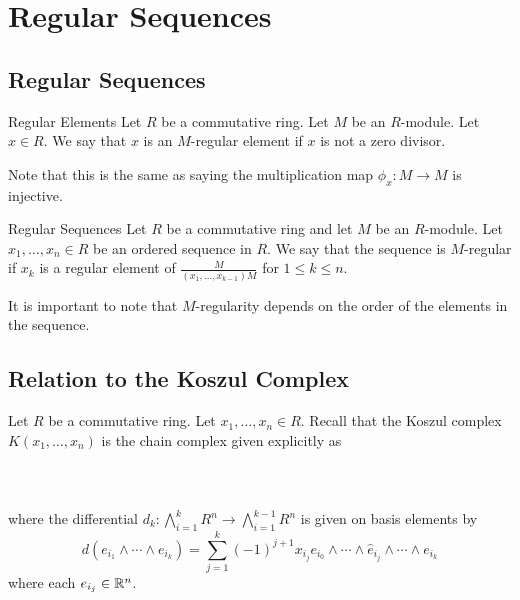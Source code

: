 \documentclass[a4paper]{article}
\begin{document}
\pagebreak
\section{Regular Sequences}
\subsection{Regular Sequences}
\begin{defn}{Regular Elements}{} Let $R$ be a commutative ring. Let $M$ be an $R$-module. Let $x\in R$. We say that $x$ is an $M$-regular element if $x$ is not a zero divisor. 
\end{defn}

Note that this is the same as saying the multiplication map $\phi_x:M\to M$ is injective. 

\begin{defn}{Regular Sequences}{} Let $R$ be a commutative ring and let $M$ be an $R$-module. Let $x_1,\dots,x_n\in R$ be an ordered sequence in $R$. We say that the sequence is $M$-regular if $x_k$ is a regular element of $\frac{M}{(x_1,\dots,x_{k-1})M}$ for $1\leq k\leq n$. 
\end{defn}

It is important to note that $M$-regularity depends on the order of the elements in the sequence. 

\subsection{Relation to the Koszul Complex}
Let $R$ be a commutative ring. Let $x_1,\dots,x_n\in R$. Recall that the Koszul complex $K(x_1,\dots,x_n)$ is the chain complex given explicitly as \\~\\
\\~\\
where the differential $d_k:\bigwedge_{i=1}^kR^n\to\bigwedge_{i=1}^{k-1}R^n$ is given on basis elements by $$d(e_{i_1}\wedge\cdots\wedge e_{i_k})=\sum_{j=1}^k(-1)^{j+1}x_{i_j}e_{i_0}\wedge\cdots\wedge\hat{e}_{i_j}\wedge\cdots\wedge e_{i_k}$$ where each $e_{i_j}\in\mathbb{R}^n$. \\
\end{document}
